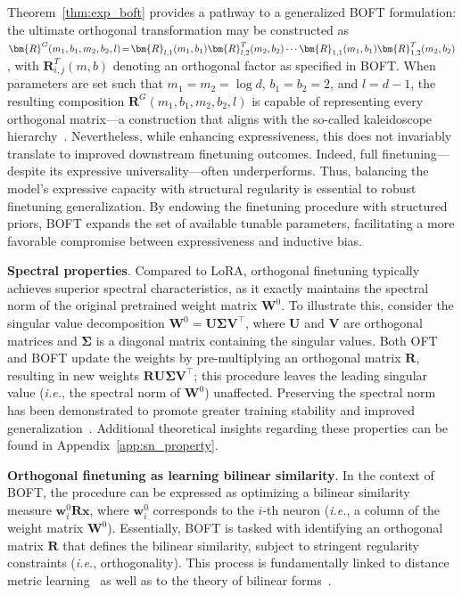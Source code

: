 Theorem~\ref{thm:exp_boft} provides a pathway to a generalized BOFT formulation: the ultimate orthogonal transformation may be constructed as $\thickmuskip=2mu \medmuskip=2mu \bm{R}^G(m_1,b_1,m_2,b_2,l)=\bm{R}_{l,1}(m_1,b_1)\bm{R}_{l,2}^T(m_2,b_2)\cdots\bm{R}_{1,1}(m_1,b_1)\bm{R}_{1,2}^T(m_2,b_2)$, with $\bm{R}_{i,j}^T(m,b)$ denoting an orthogonal factor as specified in BOFT. When parameters are set such that $m_1 = m_2 = \log d$, $b_1 = b_2 = 2$, and $l = d-1$, the resulting composition $\bm{R}^G(m_1,b_1,m_2,b_2,l)$ is capable of representing every orthogonal matrix—a construction that aligns with the so-called kaleidoscope hierarchy~\cite{dao2019kaleidoscope}. Nevertheless, while enhancing expressiveness, this does not invariably translate to improved downstream finetuning outcomes. Indeed, full finetuning—despite its expressive universality—often underperforms. Thus, balancing the model’s expressive capacity with structural regularity is essential to robust finetuning generalization. By endowing the finetuning procedure with structured priors, BOFT expands the set of available tunable parameters, facilitating a more favorable compromise between expressiveness and inductive bias.

\textbf{Spectral properties}. Compared to LoRA, orthogonal finetuning typically achieves superior spectral characteristics, as it exactly maintains the spectral norm of the original pretrained weight matrix $\bm{W}^0$. To illustrate this, consider the singular value decomposition $\bm{W}^0=\bm{U}\bm{\Sigma}\bm{V}^\top$, where $\bm{U}$ and $\bm{V}$ are orthogonal matrices and $\bm{\Sigma}$ is a diagonal matrix containing the singular values. Both OFT and BOFT update the weights by pre-multiplying an orthogonal matrix $\bm{R}$, resulting in new weights $\bm{R}\bm{U}\bm{\Sigma}\bm{V}^\top$; this procedure leaves the leading singular value (\emph{i.e.}, the spectral norm of $\bm{W}^0$) unaffected. Preserving the spectral norm has been demonstrated to promote greater training stability and improved generalization~\cite{miyato2018spectral,yoshida2017spectral}. Additional theoretical insights regarding these properties can be found in Appendix~\ref{app:sn_property}.

\textbf{Orthogonal finetuning as learning bilinear similarity}. In the context of BOFT, the procedure can be expressed as optimizing a bilinear similarity measure $\bm{w}^0_i\bm{R}\bm{x}$, where $\bm{w}^0_i$ corresponds to the $i$-th neuron (\emph{i.e.}, a column of the weight matrix $\bm{W}^0$). Essentially, BOFT is tasked with identifying an orthogonal matrix $\bm{R}$ that defines the bilinear similarity, subject to stringent regularity constraints (\emph{i.e.}, orthogonality). This process is fundamentally linked to distance metric learning~\cite{xing2002distance} as well as to the theory of bilinear forms~\cite{roman2005advanced}.

